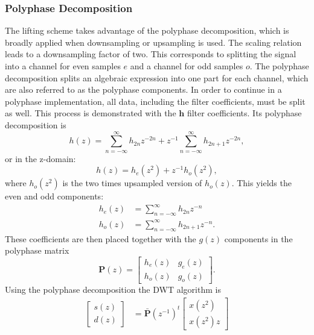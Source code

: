 \begin{refsection}
\subsubsection{Polyphase Decomposition \label{fpga:polyphase}}

The lifting scheme takes advantage of the polyphase decomposition, which is broadly applied when downsampling or upsampling is used. 
The scaling relation leads to a downsampling factor of two.
This corresponds to splitting the signal into a channel for even samples $e$ and a channel for odd samples $o$.
The polyphase decomposition splits an algebraic expression into one part for each channel, which are also referred to as the polyphase components.
In order to continue in a polyphase implementation, all data, including the filter coefficients, must be split as well.
This process is demonstrated with the $\bm h$ filter coefficients.
Its polyphase decomposition is
\begin{equation}
	h(z) = \sum_{n=-\infty}^{\infty} h_{2n} z^{-2n} + z^{-1} \sum_{n=-\infty}^{\infty} h_{2n+1} z^{-2n},
\end{equation}
or in the z-domain:
\begin{equation}
	h(z)=h_{e}(z^2) + z^{-1} h_o(z^2),
\end{equation}
where $h_o(z^2)$ is the two times upsampled version of $h_o(z)$.
This yields the even and odd components:
\begin{align}
	h_e(z) &= \sum_{n=-\infty}^{\infty} h_{2n} z^{-n}
	\\
	h_o(z) &= \sum_{n=-\infty}^{\infty} h_{2n+1} z^{-n}.
\end{align}
These coefficients are then placed together with the $g(z)$ components in the polyphase matrix
\begin{equation}
	\bm P(z) = 
	\begin{bmatrix}
	h_e(z) & g_e(z) \\
	h_o(z) & g_o(z)
	\end{bmatrix}.
\end{equation}
Using the polyphase decomposition the DWT algorithm is
\begin{align}
\begin{bmatrix}
	s(z) \\
	d(z)
\end{bmatrix}
&=
\bm{\bar P}(z^{-1})^t
\begin{bmatrix}
	x(z^2) \\     
	x(z^2) z
\end{bmatrix}

\end{align}
\end{refsection}
